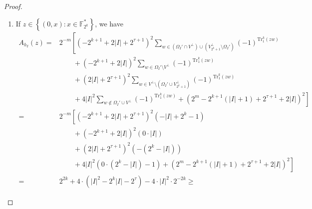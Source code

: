 \documentclass[10pt]{article}
\newcommand{\F}{\mathbb{F}}
\newcommand{\0}{\textbf{0}}
\newcommand{\1}{\textbf{1}}
\newcommand{\tr}{\mathrm{Tr}_1^k}
\newcommand{\CardI}{\left|I\right|}
\begin{document}
{{\begin{proof}
\begin{enumerate}[label=\textbf{Case \Alph{*}}]
\begin{align*}
        &\qquad+\left( -2^{k+1}+2\CardI \right)^2\sum_{w\in\Omega_I'\setminus V^{\perp}}(-1)^{\tr(zw)}\\
        &\qquad+\left( 2\CardI+2^{\tau+1} \right)^2\sum_{w\in V^{\perp}\setminus\left( \Omega_I'\cup V_{2^k+1}^{\perp} \right)}(-1)^{\tr(zw)}\\
        &\left.\qquad+4\CardI^2\sum_{w\not\in\Omega_I'\cup V^{\perp}}(-1)^{\tr(zw)}+\left( 2^m-2^{k+1}\left(\CardI+1\right)+2^{\tau+1}+2\CardI \right)^2\right]\\
        =& 2^{-m}\left[ \left( -2^{k+1}+2\CardI+2^{\tau+1} \right)^2 \left( -\CardI-1 \right) \right.\\
        &\qquad+\left( -2^{k+1}+2\CardI \right)^2 \left( 0\cdot\CardI \right) \\
        &\qquad+\left( 2\CardI+2^{\tau+1} \right)^2 \left( -\left( 2^k-\CardI \right) \right)\\
        &\left.\qquad+4\CardI^2 \left( 0\cdot\left( 2^k-\CardI \right) + \left( 2^k-1 \right) \right)+\left( 2^m-2^{k+1}\left(\CardI+1\right)+2^{\tau+1}+2\CardI \right)^2\right]\\
        =& 2^{2k} +4\cdot\left( \CardI^2-\left( 2^k-2 \right)\CardI-2^k+2^{\tau} \right) -4\cdot\left( 2\CardI+2^{\tau} \right)\cdot 2^{-k+\tau}\\
        &\qquad -4\cdot\CardI^2\cdot 2^{-2k}. 
    \end{align*}
    \item If $z\in\left\{ (0,x):x\in\F_{2^k}^* \right\}$, we have 
    \begin{align*}
        A_{h_I}(z)= & 
        2^{-m}\left[  \left( -2^{k+1}+2\CardI+2^{\tau+1} \right)^2\sum_{w\in\left( \Omega_I'\cap V^{\perp}\right)\cup \left( V_{2^k+1}^{\perp}\setminus\Omega_I' \right)}(-1)^{\tr(zw)}\right.\\
        &\qquad+\left( -2^{k+1}+2\CardI \right)^2\sum_{w\in\Omega_I'\setminus V^{\perp}}(-1)^{\tr(zw)}\\
        &\qquad+\left( 2\CardI+2^{\tau+1} \right)^2\sum_{w\in V^{\perp}\setminus\left( \Omega_I'\cup V_{2^k+1}^{\perp} \right)}(-1)^{\tr(zw)}\\
        &\left.\qquad+4\CardI^2\sum_{w\not\in\Omega_I'\cup V^{\perp}}(-1)^{\tr(zw)}+\left( 2^m-2^{k+1}\left(\CardI+1\right)+2^{\tau+1}+2\CardI \right)^2\right]\\
        =& 2^{-m}\left[ \left( -2^{k+1}+2\CardI+2^{\tau+1} \right)^2 \left( -\CardI+2^k-1 \right) \right.\\
        &\qquad+\left( -2^{k+1}+2\CardI \right)^2 \left( 0\cdot\CardI \right) \\
        &\qquad+\left( 2\CardI+2^{\tau+1} \right)^2 \left( -\left( 2^k-\CardI \right) \right)\\
        &\left.\qquad+4\CardI^2 \left( 0\cdot\left( 2^k-\CardI \right) -1 \right)+\left( 2^m-2^{k+1}\left(\CardI+1\right)+2^{\tau+1}+2\CardI \right)^2\right]\\
        =& 2^{2k} + 4\cdot\left( \CardI^2-2^k\CardI-2^{\tau} \right) - 4\cdot\CardI^2\cdot 2^{-2k}
        \ge&   
    \end{align*}
\end{enumerate}


\end{proof}}}
\end{document}
